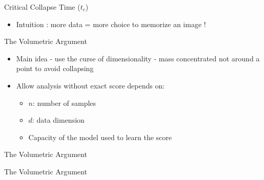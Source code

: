 \documentclass[aspectratio=169]{beamer}
\begin{document}
\begin{frame}{Critical Collapse Time ($t_c$)}
\begin{itemize}
    \item Intuition : more data = more choice to memorize an image !
\end{itemize}
\begin{center}
    \end{center}
\end{frame}


\begin{frame}{The Volumetric Argument}
    \begin{itemize}
        \item Main idea - use the curse of dimensionality - mass concentrated not around a point to avoid collapsing
    
        \item Allow analysis without exact score depends on:
        \begin{itemize}
            \item $n$: number of samples
            \item $d$: data dimension
            \item Capacity of the model used to learn the score
        \end{itemize}
    \end{itemize}
\end{frame}

\begin{frame}{The Volumetric Argument}
    
    \begin{center}
    \end{center}
\end{frame}


\begin{frame}{The Volumetric Argument}
    
    \begin{center}
    \end{center}
\end{frame}
\end{document}
